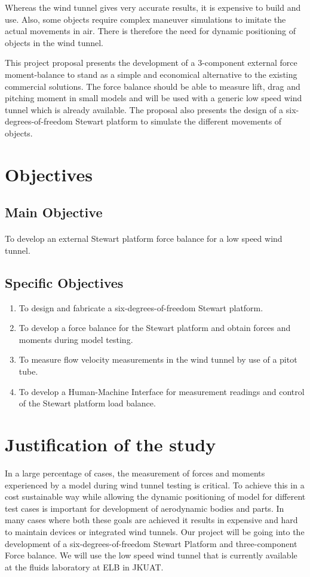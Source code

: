 Whereas the wind tunnel gives very accurate results, it is expensive to build and use. Also, some objects require complex maneuver simulations to imitate the actual movements in air. There is therefore the need for dynamic positioning of objects in the wind tunnel.

This project proposal presents the development of a 3-component external force moment-balance to stand as a simple and economical alternative to the existing commercial solutions. The force balance should be able to measure lift, drag and pitching moment in small models and will be used with a generic low speed wind tunnel which is already available. The proposal also presents the design of a six-degrees-of-freedom Stewart platform to simulate the different movements of objects.
\section{Objectives}
\subsection{Main Objective}
\paragraph{} To develop an external Stewart platform force balance for a low speed wind tunnel. 
\subsection{Specific Objectives}
\begin{enumerate}
\item To design and fabricate a six-degrees-of-freedom Stewart platform.
\item To develop a force balance for the Stewart platform and obtain forces and moments during model testing.
\item To measure flow velocity measurements in the wind tunnel by use of a pitot tube.
\item To develop a Human-Machine Interface for measurement readings and control of the Stewart platform load balance.
\end{enumerate}
\section{Justification of the study}
In a large percentage of cases, the measurement of forces and moments experienced by a model during wind tunnel testing is critical. To achieve this in a cost sustainable way while allowing the dynamic positioning of model for different test cases is important for development of aerodynamic bodies and parts. In many cases where both these goals are achieved it results in expensive and hard to maintain devices or integrated wind tunnels. Our project will be going into the development of a six-degrees-of-freedom Stewart Platform and three-component Force balance. We will use the low speed wind tunnel that is currently available at the fluids laboratory at ELB in JKUAT.
